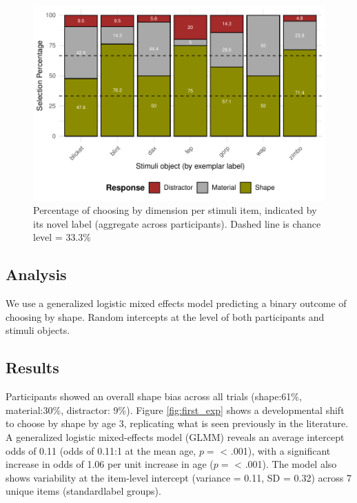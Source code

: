 \documentclass[10pt, letterpaper]{article}
\newenvironment{CodeChunk}{}{}
\begin{document}
\begin{CodeChunk}
\begin{figure}[tb]
\includegraphics[width=1\linewidth]{figs/first_exp_stim-1} \caption[Percentage of choosing by dimension per stimuli item, indicated by its novel label (aggregate across participants)]{Percentage of choosing by dimension per stimuli item, indicated by its novel label (aggregate across participants). Dashed line is chance level = 33.3\% }\label{fig:first_exp_stim}
\end{figure}
\end{CodeChunk}

\hypertarget{analysis}{%
\subsection{Analysis}\label{analysis}}

We use a generalized logistic mixed effects model predicting a binary
outcome of choosing by shape. Random intercepts at the level of both
participants and stimuli objects.

\hypertarget{results}{%
\subsection{Results}\label{results}}

Participants showed an overall shape bias across all trials (shape:61\%,
material:30\%, distractor: 9\%). Figure \ref{fig:first_exp} shows a
developmental shift to choose by shape by age 3, replicating what is
seen previously in the literature.\\
A generalized logistic mixed-effects model (GLMM) reveals an average
intercept odds of 0.11 (odds of 0.11:1 at the mean age, \(p=\)
\textless{} .001), with a significant increase in odds of 1.06 per unit
increase in age (\(p=\) \textless{} .001). The model also shows
variability at the item-level intercept (variance = 0.11, SD = 0.32)
across 7 unique items (standardlabel groups).
\end{document}
